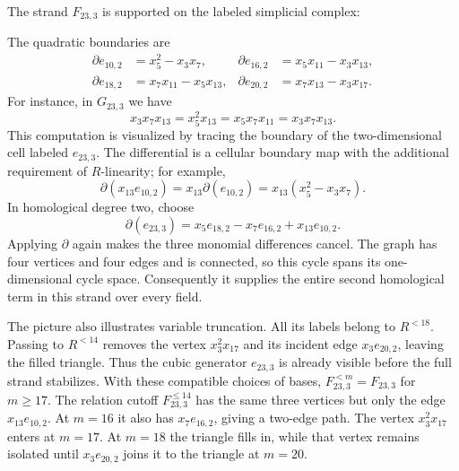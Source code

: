 \Needspace{8cm}
\begin{example}\label{ex:original23}
The strand $F_{23,3}$ is supported on the labeled simplicial complex:
\nopagebreak
\begin{center}
\end{center}
The quadratic boundaries are
\[
\begin{aligned}
 \partial e_{10,2}&=x_5^2-x_3x_7,&
 \partial e_{16,2}&=x_5x_{11}-x_3x_{13},\\
 \partial e_{18,2}&=x_7x_{11}-x_5x_{13},&
 \partial e_{20,2}&=x_7x_{13}-x_3x_{17}.
\end{aligned}
\]
For instance, in $G_{23,3}$ we have
\[
 x_3x_7x_{13}=x_5^2x_{13}=x_5x_7x_{11}=x_3x_7x_{13}.
\]
This computation is visualized by tracing the boundary of the
two-dimensional cell labeled $e_{23,3}$. The differential is a cellular
boundary map with the additional requirement of $R$-linearity; for
example,
\[
 \partial(x_{13}e_{10,2})=x_{13}\partial(e_{10,2})
 =x_{13}(x_5^2-x_3x_7).
\]
In homological degree two, choose
\[
 \partial(e_{23,3})=x_5e_{18,2}-x_7e_{16,2}+x_{13}e_{10,2}.
\]
Applying $\partial$ again makes the three monomial differences
cancel. The graph has four vertices and four edges and is connected,
so this cycle spans its one-dimensional cycle space. Consequently
it supplies the entire second homological term in this strand over
every field.

The picture also illustrates variable truncation. All its labels
belong to $R^{<18}$. Passing to $R^{<14}$ removes the vertex
$x_3^2x_{17}$ and its incident edge $x_3e_{20,2}$, leaving the filled
triangle. Thus the cubic generator $e_{23,3}$ is already visible before
the full strand stabilizes. With these compatible choices of bases,
$F_{23,3}^{<m}=F_{23,3}$ for $m\geq17$. The relation cutoff
$F_{23,3}^{\le14}$ has the same three vertices but only the edge
$x_{13}e_{10,2}$. At $m=16$ it also has $x_7e_{16,2}$, giving a
two-edge path. The vertex $x_3^2x_{17}$ enters at $m=17$. At $m=18$ the
triangle fills in, while that vertex remains isolated until
$x_3e_{20,2}$ joins it to the triangle at $m=20$.
\end{example}

